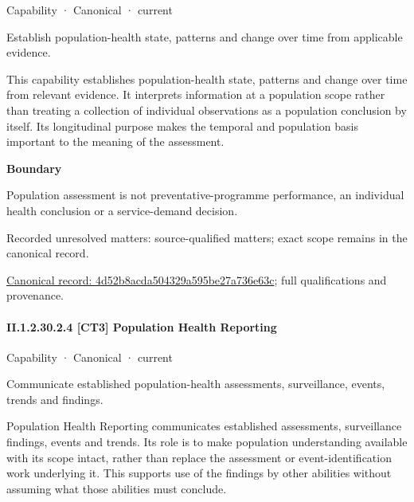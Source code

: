 \label{element:4d52b8acda504329a595be27a736e63c}
{\small Capability · Canonical · current}\par

Establish population-health state, patterns and change over time from applicable evidence.



This capability establishes population-health state, patterns and change over time from relevant evidence. It interprets information at a population scope rather than treating a collection of individual observations as a population conclusion by itself. Its longitudinal purpose makes the temporal and population basis important to the meaning of the assessment.



\textbf{Boundary}



Population assessment is not preventative-programme performance, an individual health conclusion or a service-demand decision.


{\small Recorded unresolved matters: source-qualified matters; exact scope remains in the canonical record.}\par
{\footnotesize \href{../../../../continuum/strategy/capability/4d52b8acda504329a595be27a736e63c.md}{Canonical record: 4d52b8acda504329a595be27a736e63c}; full qualifications and provenance.}\par
\paragraph*{II.1.2.30.2.4 [CT3] Population Health Reporting}
\label{navigation:II.1.2.30.2.4}

\label{element:50b8b0884f8444c4b11d9e0f7a7754a3}
{\small Capability · Canonical · current}\par

Communicate established population-health assessments, surveillance, events, trends and findings.



Population Health Reporting communicates established assessments, surveillance findings, events and trends. Its role is to make population understanding available with its scope intact, rather than replace the assessment or event-identification work underlying it. This supports use of the findings by other abilities without assuming what those abilities must conclude.



